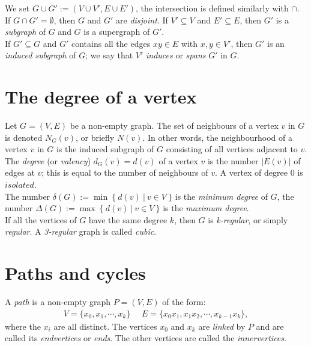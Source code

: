 \documentclass[11pt]{book}
\begin{document}
		We set $G \cup G' := (V \cup V', E \cup E')$, the intersection is defined similarly with $\cap$. If $G \cap G' = \emptyset$, then $G$ and $G'$ are \textit{disjoint}. If $V' \subseteq V$ and $E' \subseteq E$, then $G'$ is a \textit{subgraph} of $G$ and $G$ is a supergraph of $G'$.\\
		
		If $G' \subseteq G$ and $G'$ contains all the edges $xy \in E$ with $x, y \in V'$, then $G'$ is an \textit{induced subgraph} of $G$; we say that $V'$ \textit{induces} or \textit{spans} $G'$ in $G$.  
		
	\section{The degree of a vertex}
		Let $G = (V, E)$ be a non-empty graph. The set of neighbours of a vertex $v$ in $G$ is denoted $N_G (v)$, or briefly $N(v)$. In other words, the neighbourhood of a vertex $v$ in $G$ is the induced subgraph of $G$ consisting of all vertices adjacent to $v$. \\
	
		The \textit{degree} (or \textit{valency}) $d_G (v) = d(v)$ of a vertex $v$ is the number $|E(v)|$ of edges at $v$; this is equal to the number of neighbours of $v$. A vertex of degree 0 is $isolated$. \\
		
		The number $\delta(G) := \min~ \{~ d(v) ~| ~v \in V ~\}$ is the \textit{minimum degree} of $G$, the number $\Delta(G) := \max ~\{~ d(v) ~|~ v \in V ~\}$ is the \textit{maximum degree}.\\
		
		If all the vertices of $G$ have the same degree $k$, then $G$ is \textit{k-regular}, or simply \textit{regular}. A \textit{3-regular} graph is called \textit{cubic}.
	
	\section{Paths and cycles}
		A \textit{path} is a non-empty graph $P = (V, E)$ of the form:
		\begin{eqnarray*}
			V = \{x_0, x_1, \dotsb, x_k \} ~~~~~~ E = \{x_0x_1, x_1x_2, \dotsb, x_{k-1}x_k\},
		\end{eqnarray*}		
		where the $x_i$ are all distinct. The vertices $x_0$ and $x_k$ are \textit{linked} by $P$ and are called its \textit{endvertices} or \textit{ends}. The other vertices are called the \textit{innervertices}.\\
		
\end{document}
